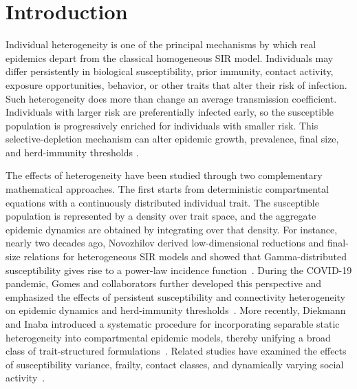 \documentclass[pdflatex,sn-mathphys-ay]{sn-jnl}
\theoremstyle{thmstyleone}
\theoremstyle{thmstyletwo}
\theoremstyle{thmstylethree}
\begin{document}

\maketitle
\tableofcontents
\section{Introduction}\label{sec:intro}

Individual heterogeneity is one of the principal mechanisms by which real
epidemics depart from the classical homogeneous SIR model. Individuals may
differ persistently in biological susceptibility, prior immunity, contact
activity, exposure opportunities, behavior, or other traits that alter their
risk of infection. Such heterogeneity does more than change an average
transmission coefficient. Individuals with larger risk are preferentially
infected early, so the susceptible population is progressively enriched for
individuals with smaller risk. This selective-depletion mechanism \citep{VaupelYashin1985} can alter
epidemic growth, prevalence, final size, and herd-immunity thresholds
\citep{Dwyer1991,Novozhilov2008,Miller2014,
GomesEtAl2022,MontalbanEtAl2022}.

The  effects of heterogeneity  have been studied through two complementary mathematical approaches. The first
starts from deterministic compartmental equations with a continuously
distributed individual trait. The susceptible population is represented by a
density over trait space, and the aggregate epidemic dynamics are obtained by
integrating over that density.  For instance, nearly two decades ago, Novozhilov derived low-dimensional reductions and final-size relations for heterogeneous SIR models and showed that Gamma-distributed susceptibility gives rise to a power-law incidence function~\citep{Novozhilov2008}. During the COVID-19 pandemic, Gomes and collaborators further developed this perspective and emphasized the effects of persistent susceptibility and connectivity heterogeneity on epidemic dynamics and herd-immunity thresholds~\citep{GomesEtAl2022}. More recently, Diekmann and Inaba introduced a systematic procedure for incorporating separable static heterogeneity into compartmental epidemic models, thereby unifying a broad class of trait-structured formulations~\citep{DiekmannInaba2023}. Related studies have examined the effects of susceptibility variance, frailty, contact classes, and dynamically varying social activity~\citep{MargheriEtAl2015,Szapudi2020,TkachenkoEtAl2021}.
\end{document}
